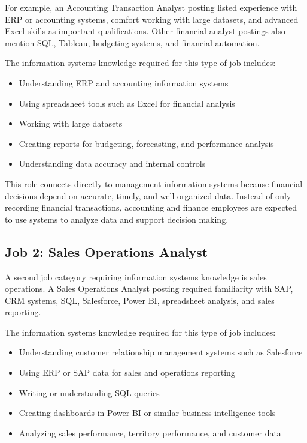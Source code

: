 \documentclass[12pt]{article}
\begin{document}
For example, an Accounting Transaction Analyst posting listed experience with ERP
or accounting systems, comfort working with large datasets, and advanced Excel
skills as important qualifications. Other financial analyst postings also mention
SQL, Tableau, budgeting systems, and financial automation.

The information systems knowledge required for this type of job includes:

\begin{itemize}
    \item Understanding ERP and accounting information systems
    \item Using spreadsheet tools such as Excel for financial analysis
    \item Working with large datasets
    \item Creating reports for budgeting, forecasting, and performance analysis
    \item Understanding data accuracy and internal controls
\end{itemize}

This role connects directly to management information systems because financial
decisions depend on accurate, timely, and well-organized data. Instead of only
recording financial transactions, accounting and finance employees are expected
to use systems to analyze data and support decision making.


\subsection{Job 2: Sales Operations Analyst}

A second job category requiring information systems knowledge is sales operations.
A Sales Operations Analyst posting required familiarity with SAP, CRM systems,
SQL, Salesforce, Power BI, spreadsheet analysis, and sales reporting.

The information systems knowledge required for this type of job includes:

\begin{itemize}
    \item Understanding customer relationship management systems such as Salesforce
    \item Using ERP or SAP data for sales and operations reporting
    \item Writing or understanding SQL queries
    \item Creating dashboards in Power BI or similar business intelligence tools
    \item Analyzing sales performance, territory performance, and customer data
\end{itemize}
\end{document}
